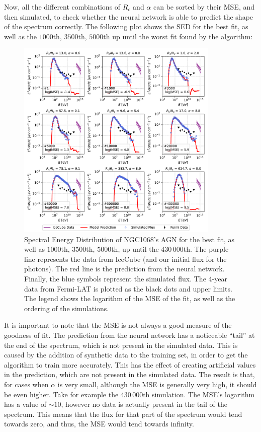 Now, all the different combinations of $R_c$ and $\alpha$ can be sorted by their MSE, and then simulated, to check whether the neural network is able to predict the shape of the spectrum correctly. The following plot shows the SED for the best fit, as well as the $1000$th, $3500$th, $5000$th up until the worst fit found by the algorithm:

\begin{figure}[H]
    \includegraphics[width=0.86\textwidth]{Figures/selected_simulations_plot.pdf}
    \centering
    \caption{Spectral Energy Distribution of NGC1068's AGN for the best fit, as well as $1000$th, $3500$th, $5000$th, up until the $430\,000$th. The purple line represents the data from IceCube (and our initial flux for the photons). The red line is the prediction from the neural network. Finally, the blue symbols represent the simulated flux. The 4-year data from Fermi-LAT is plotted as the black dots and upper limits. The legend shows the logarithm of the MSE of the fit, as well as the ordering of the simulations.}
    \label{fig:selected_simulations_plot}
\end{figure}

It is important to note that the MSE is not always a good measure of the goodness of fit. The prediction from the neural network has a noticeable ``tail'' at the end of the spectrum, which is not present in the simulated data. This is caused by the addition of synthetic data to the training set, in order to get the algorithm to train more accurately. This has the effect of creating artificial values in the prediction, which are not present in the simulated data. The result is that, for cases when $\alpha$ is very small, although the MSE is generally very high, it should be even higher. Take for example the $430\,000$th simulation. The MSE's logarithm has a value of $\sim 10$, however no data is actually present in the tail of the spectrum. This means that the flux for that part of the spectrum would tend towards zero, and thus, the MSE would tend towards infinity.

